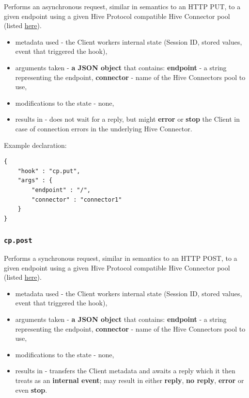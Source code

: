 \documentclass[a4paper]{article}
\begin{document}
Performs an asynchronous request, similar in semantics to an HTTP PUT, to a given endpoint using a given Hive Protocol compatible Hive Connector pool (listed \hyperref[ref-cp_connector]{here}).


\begin{itemize}
\item metadata used - the Client workers internal state (Session ID, stored values, event that triggered the hook),
\item arguments taken - \textbf{a JSON object} that contains: \textbf{endpoint} - a string representing the endpoint, \textbf{connector} - name of the Hive Connectors pool to use,
\item modifications to the state - none,
\item results in - does not wait for a reply, but might \textbf{error} or \textbf{stop} the Client in case of connection errors in the underlying Hive Connector.
\end{itemize}

\noindent
Example declaration:

\begin{verbatim}
{
    "hook" : "cp.put",
    "args" : {
        "endpoint" : "/",
        "connector" : "connector1"
    }
}
\end{verbatim}
\subsubsection{\texttt{cp.post}}
\label{sec-8-2-9}

Performs a synchronous request, similar in semantics to an HTTP POST, to a given endpoint using a given Hive Protocol compatible Hive Connector pool (listed \hyperref[ref-cp_connector]{here}).


\begin{itemize}
\item metadata used - the Client workers internal state (Session ID, stored values, event that triggered the hook),
\item arguments taken - \textbf{a JSON object} that contains: \textbf{endpoint} - a string representing the endpoint, \textbf{connector} - name of the Hive Connectors pool to use,
\item modifications to the state - none,
\item results in -  transfers the Client metadata and awaits a reply which it then treats as an \textbf{internal event}; may result in either \textbf{reply}, \textbf{no reply}, \textbf{error} or even \textbf{stop}.
\end{itemize}
\end{document}
